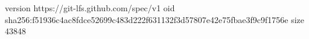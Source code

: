version https://git-lfs.github.com/spec/v1
oid sha256:f51936c4ac8fdce52699c483d222f631132f3d57807e42e75fbae3f9c9f1756e
size 43848
